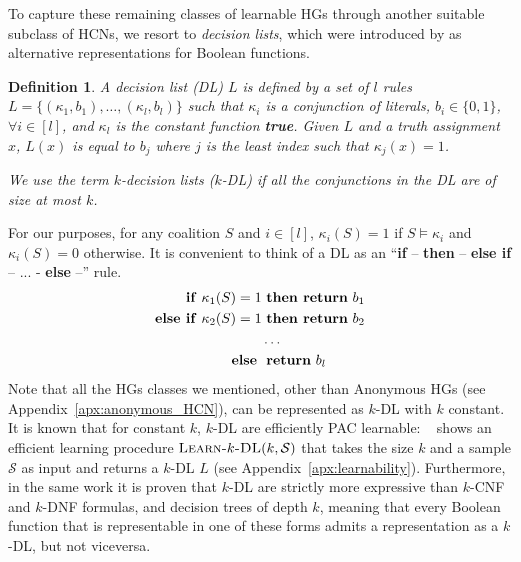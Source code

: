 \documentclass[letterpaper]{article} %
\newtheorem{definition}[theorem]{Definition}
\newcommand{\sample}{\ensuremath{\mathcal{S}}}
\newcommand{\learnkDL}{\textsc{Learn-}k\textsc{-DL}}
\begin{document}
To capture these remaining classes of learnable HGs through another suitable subclass of HCNs, we resort to \emph{decision lists}, which were introduced by \citet{Rivest87} as alternative representations for Boolean functions.
\begin{definition}
A \emph{decision list (DL)} $L$ is defined by a set of $l$ rules $L=\{(\kappa_1, b_1), \ldots, (\kappa_l, b_l)\}$ such that $\kappa_i$ is a conjunction of literals, $b_i \in \{0,1\}$, $\forall i\in [l]$, and $\kappa_l$ is the constant function \textbf{true}. Given $L$ and a truth assignment $x$, $L(x)$ is equal to $b_j$ where $j$ is the least index such that $\kappa_j(x)=1$.

We use the term $k$-decision lists ($k$-DL) if all the conjunctions in the DL are of size at most $k$.
\end{definition}
For our purposes, for any coalition $S$ and $i\in [l]$, $\kappa_i(S)=1$ if $S\models \kappa_i$ and $\kappa_i(S)=0$ otherwise. It is convenient to think of a DL as an ``\textbf{if} -- \textbf{then} -- \textbf{else if} -- ... - \textbf{else} --'' rule.
\begin{align*}
    \text{\textbf{if} } \kappa_1(S)=1 &\text{ \textbf{then return} } b_1\\
    \text{\textbf{else if} } \kappa_2(S)=1 &\text{ \textbf{then return} } b_2\\
    &\ldots\\
    \text{\textbf{else} } &\text{ \textbf{return} } b_l
\end{align*}
Note that all the HGs classes we mentioned, other than Anonymous HGs
(see Appendix~\ref{apx:anonymous_HCN}),
can be represented as $k$-DL with $k$ constant.
It is known that for constant $k$, $k$-DL
are efficiently PAC learnable: ~\citet{Rivest87} shows an efficient learning procedure $\learnkDL(k,\sample)$ that takes the size $k$ and a sample $\sample$ as input and returns a $k$-DL $L$ (see Appendix~\ref{apx:learnability}).
Furthermore, in the same work it is proven that $k$-DL are strictly more expressive than $k$-CNF and $k$-DNF formulas, and decision trees of depth $k$, meaning that every Boolean function that is representable in one of these forms admits a representation as a $k$-DL, but not viceversa.
\end{document}
